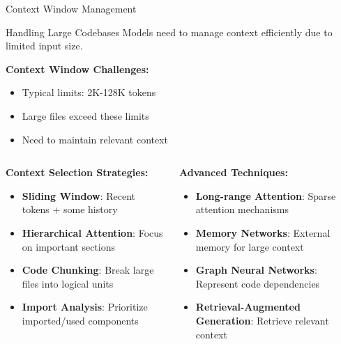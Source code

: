 \documentclass{beamer}
\begin{document}
\begin{frame}[t]{Context Window Management}
    \begin{block}{Handling Large Codebases}
        Models need to manage context efficiently due to limited input size.
    \end{block}
    
    \textbf{Context Window Challenges:}
    \begin{itemize}
        \item Typical limits: 2K-128K tokens
        \item Large files exceed these limits
        \item Need to maintain relevant context
    \end{itemize}
    
    \begin{columns}[t]
        \begin{column}{0.5\textwidth}
            \textbf{Context Selection Strategies:}
            \begin{itemize}
                \item \textbf{Sliding Window}: Recent tokens + some history
                \item \textbf{Hierarchical Attention}: Focus on important sections
                \item \textbf{Code Chunking}: Break large files into logical units
                \item \textbf{Import Analysis}: Prioritize imported/used components
            \end{itemize}
        \end{column}
        \begin{column}{0.5\textwidth}
            \textbf{Advanced Techniques:}
            \begin{itemize}
                \item \textbf{Long-range Attention}: Sparse attention mechanisms
                \item \textbf{Memory Networks}: External memory for large context
                \item \textbf{Graph Neural Networks}: Represent code dependencies
                \item \textbf{Retrieval-Augmented Generation}: Retrieve relevant context
            \end{itemize}
        \end{column}
    \end{columns}
\end{frame}
\end{document}
